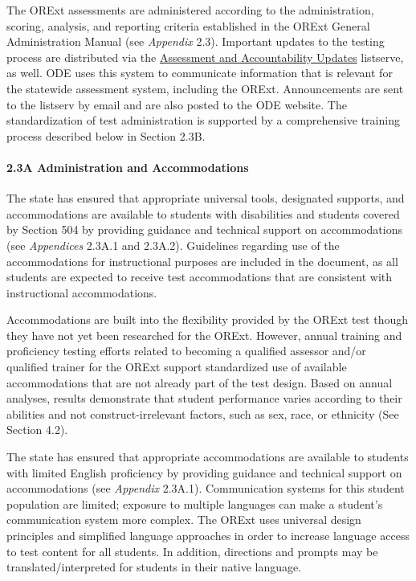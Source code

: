 \documentclass[]{article}
\let\oldparagraph\paragraph
\renewcommand{\paragraph}[1]{\oldparagraph{#1}\mbox{}}
\begin{document}
The ORExt assessments are administered according to the administration,
scoring, analysis, and reporting criteria established in the ORExt
General Administration Manual (see \emph{Appendix} 2.3). Important
updates to the testing process are distributed via the
\color{link}\href{http://www.oregon.gov/ode/educator-resources/assessment/Pages/Assessment-and-Accountability-Update.aspx}{Assessment
and Accountability Updates} \color{black} listserve, as well. ODE uses
this system to communicate information that is relevant for the
statewide assessment system, including the ORExt. Announcements are sent
to the listserv by email and are also posted to the ODE website. The
standardization of test administration is supported by a comprehensive
training process described below in Section 2.3B.

\paragraph{2.3A Administration and
Accommodations}\label{a-administration-and-accommodations}

The state has ensured that appropriate universal tools, designated
supports, and accommodations are available to students with disabilities
and students covered by Section 504 by providing guidance and technical
support on accommodations (see \emph{Appendices} 2.3A.1 and 2.3A.2).
Guidelines regarding use of the accommodations for instructional
purposes are included in the document, as all students are expected to
receive test accommodations that are consistent with instructional
accommodations.

Accommodations are built into the flexibility provided by the ORExt test
though they have not yet been researched for the ORExt. However, annual
training and proficiency testing efforts related to becoming a qualified
assessor and/or qualified trainer for the ORExt support standardized use
of available accommodations that are not already part of the test
design. Based on annual analyses, results demonstrate that student
performance varies according to their abilities and not
construct-irrelevant factors, such as sex, race, or ethnicity (See
Section 4.2).

The state has ensured that appropriate accommodations are available to
students with limited English proficiency by providing guidance and
technical support on accommodations (see \emph{Appendix} 2.3A.1).
Communication systems for this student population are limited; exposure
to multiple languages can make a student's communication system more
complex. The ORExt uses universal design principles and simplified
language approaches in order to increase language access to test content
for all students. In addition, directions and prompts may be
translated/interpreted for students in their native language.
\end{document}
